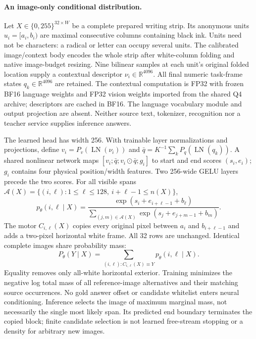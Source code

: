 \documentclass[10pt,a4paper]{article}
\begin{document}
\paragraph{An image-only conditional distribution.}
Let $X\in\{0,255\}^{32\times W}$ be a complete prepared writing strip.
Its anonymous units $u_i=[a_i,b_i)$ are maximal consecutive columns containing
black ink. Units need not be characters: a radical or letter can occupy
several units. The calibrated image/context body\cite{qwen3vl} encodes the
whole strip after white-column folding and native image-budget resizing.
Nine bilinear samples at each unit's original folded location supply a
contextual descriptor $\nu_i\in\mathbb R^{4096}$. All final numeric task-frame
states $q_k\in\mathbb R^{4096}$ are retained. The contextual computation is
FP32 with frozen BF16 language weights and FP32 vision weights imported from
the shared Q4 archive; descriptors are cached in BF16. The language vocabulary
module and output projection are absent. Neither source text, tokenizer,
recognition nor a teacher service supplies inference answers.

The learned head has width 256. With trainable layer normalizations and
projections, define $v_i=P_v(\operatorname{LN}(\nu_i))$ and
$\bar q=K^{-1}\sum_k P_q(\operatorname{LN}(q_k))$. A shared nonlinear network
maps $[v_i;\bar q;v_i\odot\bar q;g_i]$ to start and end scores $(s_i,e_i)$;
$g_i$ contains four physical position/width features. Two 256-wide GELU
layers precede the two scores. For all visible spans
$\mathcal A(X)=\{(i,\ell):1\leq\ell\leq128,\ i+\ell-1\leq n(X)\}$,
\[
 p_\theta(i,\ell\mid X)=
 \frac{\exp(s_i+e_{i+\ell-1}+b_\ell)}{\sum_{(j,m)\in\mathcal A(X)}\exp(s_j+e_{j+m-1}+b_m)}.
\]
The motor $C_{i,\ell}(X)$ copies every original pixel between $a_i$ and
$b_{i+\ell-1}$ and adds a two-pixel horizontal white frame. All 32 rows are
unchanged. Identical complete images share probability mass:
\[
 P_\theta(Y\mid X)=\sum_{(i,\ell):C_{i,\ell}(X)\equiv Y}
                         p_\theta(i,\ell\mid X).
\]
Equality removes only all-white horizontal exterior. Training minimizes
the negative log total mass of all reference-image alternatives and their
matching source occurrences. No gold answer offset or candidate whitelist
enters neural conditioning. Inference selects the image of maximum marginal
mass, not necessarily the single most likely span. Its predicted end boundary
terminates the copied block; finite candidate selection is not learned
free-stream stopping or a density for arbitrary new images.
\end{document}
